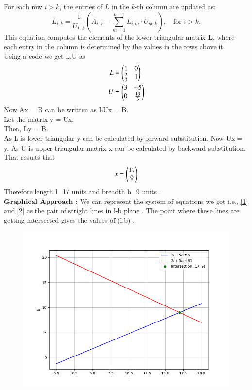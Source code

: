 \documentclass[journal]{IEEEtran}
\begin{document}
For each row $ i > k $, the entries of $ L $ in the $ k $-th column are updated as:
\[
L_{i,k} = \frac{1}{U_{k,k}} \left( A_{i,k} - \sum_{m=1}^{k-1} L_{i,m} \cdot U_{m,k} \right), \quad \text{for } i > k.
\]
This equation computes the elements of the lower triangular matrix $ \mathbf{L} $, where each entry in the column is determined by the values in the rows above it.\\
Using a code we get L,U as 
\begin{align}
	L&=\begin{pmatrix}1 & 0 \\ \frac{2}{3} & 1\end{pmatrix} \\
    U&=\begin{pmatrix}3 & -5 \\ 0& \frac{19}{3}\end{pmatrix}
\end{align}
Now Ax = B can be written as LUx = B. \\
Let the matrix y = Ux. \\
Then, Ly = B.\\
As L is lower triangular y can be calculated by forward substitution.
Now Ux = y.
As U is upper triangular matrix x can be calculated by backward substitution.
That results that \begin{align}
x = \begin{pmatrix}17 \\ 9\end{pmatrix}
\end{align}
Therefore length l=17 units and breadth b=9 units . \\
\textbf{Graphical Approach :}
We can represent the system of equations we got i.e., \eqref{1} and \eqref{2} as the pair of stright lines in l-b plane . The point where these lines are getting intersected gives the values of (l,b) . 

\begin{figure}[h]
    \centering
    \includegraphics[width=\columnwidth]{fig/plot.png}
    \label{figure:1.1}
\end{figure}
\end{document}
